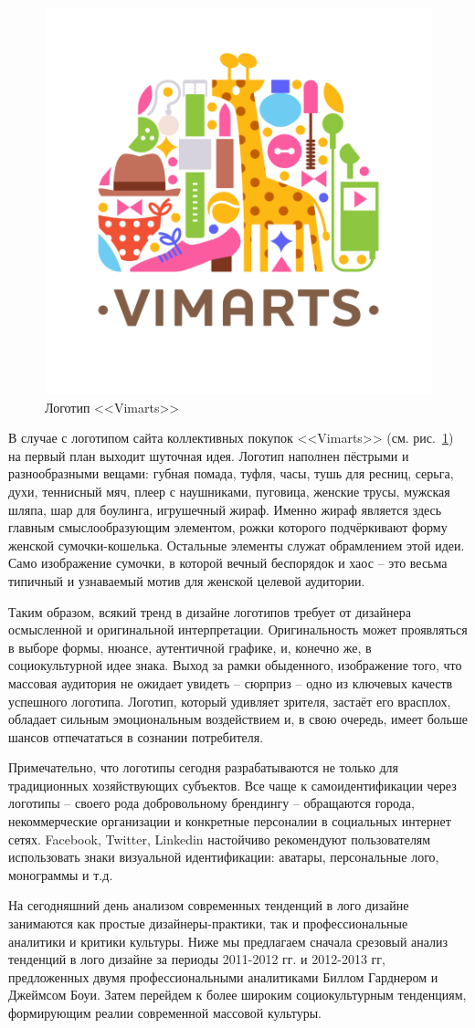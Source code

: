 \begin{figure}[h!]
  \centering
  \includegraphics[width=.3\linewidth]{images/vimarts}
  \caption{Логотип <<Vimarts>>}
  \label{fig:vimarts}
\end{figure}

В случае с логотипом сайта коллективных покупок <<Vimarts>> (см. рис.~\ref{fig:vimarts}) на первый план выходит шуточная идея. Логотип наполнен пёстрыми и разнообразными вещами: губная помада, туфля, часы, тушь для ресниц, серьга, духи, теннисный мяч, плеер с наушниками, пуговица, женские трусы, мужская шляпа, шар для боулинга, игрушечный жираф. Именно жираф является здесь главным смыслообразующим элементом, рожки которого подчёркивают форму женской сумочки-кошелька. Остальные элементы служат обрамлением этой идеи. Само изображение сумочки, в которой вечный беспорядок и хаос -- это весьма типичный и узнаваемый мотив для женской целевой аудитории.

Таким образом, всякий тренд в дизайне логотипов требует от дизайнера осмысленной и оригинальной интерпретации. Оригинальность может проявляться в выборе формы, нюансе, аутентичной графике, и, конечно же, в социокультурной идее знака. Выход за рамки обыденного, изображение того, что массовая аудитория не ожидает увидеть -- сюрприз -- одно из ключевых качеств успешного логотипа. Логотип, который удивляет зрителя, застаёт его врасплох, обладает сильным эмоциональным воздействием и, в свою очередь, имеет больше шансов отпечататься в сознании потребителя.

Примечательно, что логотипы сегодня разрабатываются не только для традиционных хозяйствующих субъектов. Все чаще к самоидентификации через логотипы -- своего рода добровольному брендингу -- обращаются города, некоммерческие организации и  конкретные персоналии в социальных интернет сетях. Facebook, Twitter, Linkedin настойчиво рекомендуют пользователям использовать знаки визуальной идентификации: аватары, персональные лого, монограммы и т.д.

На сегодняшний день анализом современных тенденций в лого дизайне занимаются как простые дизайнеры-практики, так и профессиональные аналитики и критики культуры. Ниже мы предлагаем сначала срезовый анализ тенденций в
лого дизайне за периоды 2011-2012 гг. и 2012-2013 гг,  предложенных двумя профессиональными
аналитиками Биллом Гарднером и Джеймсом Боуи. Затем перейдем к более широким социокультурным
тенденциям, формирующим реалии современной массовой культуры.

